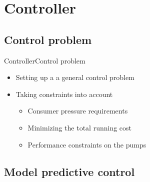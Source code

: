 \section{Controller}



\subsection{Control problem}

\begin{frame}{Controller}{Control problem}
\begin{itemize}
	\item<1-> Setting up a a general control problem 
	\item<1-> Taking constraints into account  
	 \begin{itemize}
	 \item<1-> Consumer pressure requirements
	 \item<1-> Minimizing the total running cost 
	 \item<1-> Performance constraints on the pumps
	 \end{itemize}
\end{itemize}


%  

\end{frame}


\subsection{Model predictive control}

